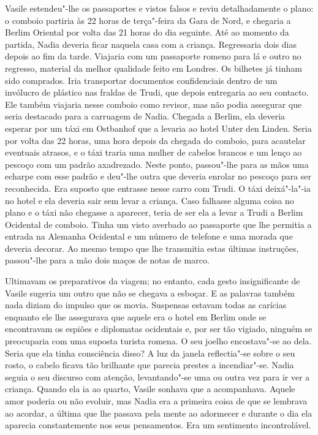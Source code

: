 Vasile estendeu"-lhe os passaportes e vistos falsos e reviu
detalhadamente o plano: o comboio partiria às 22 horas de terça"-feira da
Gara de Nord, e chegaria a Berlim Oriental por volta das 21 horas do
dia seguinte. Até ao momento da partida, Nadia deveria ficar naquela
casa com a criança. Regressaria dois dias depois ao fim da tarde.
Viajaria com um passaporte romeno para lá e outro no regresso, material da melhor qualidade feito em Londres. Os bilhetes já tinham sido
comprados. Iria transportar documentos confidenciais dentro de um
invólucro de plástico nas fraldas de Trudi, que depois entregaria ao
seu contacto. Ele também viajaria nesse comboio como revisor, mas não
podia assegurar que seria destacado para a carruagem de Nadia. Chegada a
Berlim, ela deveria esperar por um táxi em Ostbanhof que a levaria ao
hotel Unter den Linden. Seria por volta das 22 horas, uma hora depois da
chegada do comboio, para acautelar eventuais atrasos, e o táxi traria
uma mulher de cabelos brancos e um lenço ao pescoço com um padrão
axadrezado. Neste ponto, passou"-lhe para as mãos uma echarpe com esse
padrão e deu"-lhe outra que deveria enrolar no pescoço para ser
reconhecida. Era suposto que entrasse nesse carro com Trudi. O táxi
deixá"-la"-ia no hotel e ela deveria sair sem levar a criança. Caso
falhasse alguma coisa no plano e o táxi não chegasse a aparecer, teria
de ser ela a levar a Trudi a Berlim Ocidental de comboio. Tinha um
visto averbado ao passaporte que lhe permitia a entrada na Alemanha
Ocidental e um número de telefone e uma morada que deveria decorar. Ao
mesmo tempo que lhe transmitia estas últimas instruções, passou"-lhe para
a mão dois maços de notas de marco.

Ultimavam os preparativos da viagem; no entanto, cada gesto
insignificante de Vasile sugeria um outro que não se chegava a esboçar.
E as palavras também nada diziam do impulso que os movia. Suspensas
estavam todas as carícias enquanto ele lhe assegurava que aquele era o
hotel em Berlim onde se encontravam os espiões e diplomatas ocidentais
e, por ser tão vigiado, ninguém se preocuparia com uma suposta turista
romena. O seu joelho encostava"-se ao dela. Seria que ela tinha
consciência disso? A luz da janela reflectia"-se sobre o seu rosto, o
cabelo ficava tão brilhante que parecia prestes a incendiar"-se. Nadia
seguia o seu discurso com atenção, levantando"-se uma ou outra vez para
ir ver a criança. Quando ela ia ao quarto, Vasile sonhava que a
acompanhava. Aquele amor poderia ou não evoluir, mas Nadia era a
primeira coisa de que se lembrava ao acordar, a última que lhe passava
pela mente ao adormecer e durante o dia ela aparecia constantemente
nos seus pensamentos. Era um sentimento incontrolável.

